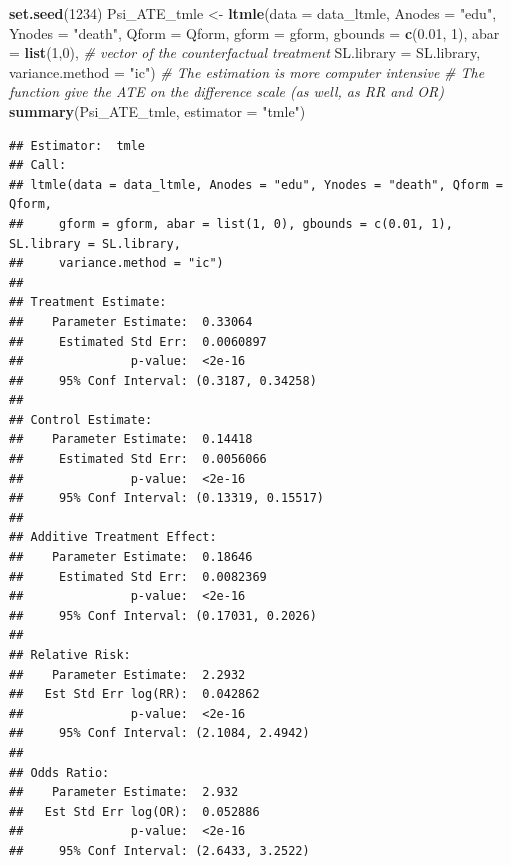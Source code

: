 \documentclass[
]{book}
\newenvironment{Shaded}{\begin{snugshade}}{\end{snugshade}}
\newcommand{\AttributeTok}[1]{\textcolor[rgb]{0.13,0.29,0.53}{#1}}
\newcommand{\CommentTok}[1]{\textcolor[rgb]{0.56,0.35,0.01}{\textit{#1}}}
\newcommand{\DecValTok}[1]{\textcolor[rgb]{0.00,0.00,0.81}{#1}}
\newcommand{\FloatTok}[1]{\textcolor[rgb]{0.00,0.00,0.81}{#1}}
\newcommand{\FunctionTok}[1]{\textcolor[rgb]{0.13,0.29,0.53}{\textbf{#1}}}
\newcommand{\NormalTok}[1]{#1}
\newcommand{\OtherTok}[1]{\textcolor[rgb]{0.56,0.35,0.01}{#1}}
\newcommand{\StringTok}[1]{\textcolor[rgb]{0.31,0.60,0.02}{#1}}
\begin{document}
\begin{Shaded}
\begin{Highlighting}[]
\FunctionTok{set.seed}\NormalTok{(}\DecValTok{1234}\NormalTok{)}
\NormalTok{Psi\_ATE\_tmle }\OtherTok{\textless{}{-}} \FunctionTok{ltmle}\NormalTok{(}\AttributeTok{data =}\NormalTok{ data\_ltmle,}
                      \AttributeTok{Anodes =} \StringTok{"edu"}\NormalTok{,}
                      \AttributeTok{Ynodes =} \StringTok{"death"}\NormalTok{,}
                      \AttributeTok{Qform =}\NormalTok{ Qform,}
                      \AttributeTok{gform =}\NormalTok{ gform,}
                      \AttributeTok{gbounds =} \FunctionTok{c}\NormalTok{(}\FloatTok{0.01}\NormalTok{, }\DecValTok{1}\NormalTok{),}
                      \AttributeTok{abar =} \FunctionTok{list}\NormalTok{(}\DecValTok{1}\NormalTok{,}\DecValTok{0}\NormalTok{), }\CommentTok{\# vector of the counterfactual treatment}
                      \AttributeTok{SL.library =}\NormalTok{ SL.library,}
                      \AttributeTok{variance.method =} \StringTok{"ic"}\NormalTok{)}
\CommentTok{\# The estimation is more computer intensive}
\CommentTok{\# The function give the ATE on the difference scale (as well, as RR and OR)}
\FunctionTok{summary}\NormalTok{(Psi\_ATE\_tmle, }\AttributeTok{estimator =} \StringTok{"tmle"}\NormalTok{)}
\end{Highlighting}
\end{Shaded}

\begin{verbatim}
## Estimator:  tmle 
## Call:
## ltmle(data = data_ltmle, Anodes = "edu", Ynodes = "death", Qform = Qform, 
##     gform = gform, abar = list(1, 0), gbounds = c(0.01, 1), SL.library = SL.library, 
##     variance.method = "ic")
## 
## Treatment Estimate:
##    Parameter Estimate:  0.33064 
##     Estimated Std Err:  0.0060897 
##               p-value:  <2e-16 
##     95% Conf Interval: (0.3187, 0.34258) 
## 
## Control Estimate:
##    Parameter Estimate:  0.14418 
##     Estimated Std Err:  0.0056066 
##               p-value:  <2e-16 
##     95% Conf Interval: (0.13319, 0.15517) 
## 
## Additive Treatment Effect:
##    Parameter Estimate:  0.18646 
##     Estimated Std Err:  0.0082369 
##               p-value:  <2e-16 
##     95% Conf Interval: (0.17031, 0.2026) 
## 
## Relative Risk:
##    Parameter Estimate:  2.2932 
##   Est Std Err log(RR):  0.042862 
##               p-value:  <2e-16 
##     95% Conf Interval: (2.1084, 2.4942) 
## 
## Odds Ratio:
##    Parameter Estimate:  2.932 
##   Est Std Err log(OR):  0.052886 
##               p-value:  <2e-16 
##     95% Conf Interval: (2.6433, 3.2522)
\end{verbatim}
\end{document}
